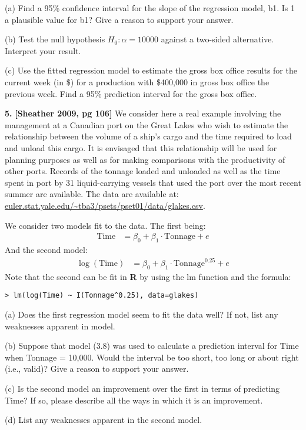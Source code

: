 \documentclass[12pt]{article}
\begin{document}
(a) Find a 95\% confidence interval for the slope of the regression model, b1. Is 1 a plausible value for b1? Give a reason to support your answer.

(b) Test the null hypothesis $H_0: \alpha =10000$ against a two-sided alternative. Interpret your result.

(c) Use the fitted regression model to estimate the gross box office results for the current week (in \$) for a production with \$400,000 in gross box office the previous week. Find a 95\% prediction interval for the gross box office.

{\bf 5.} {\bf [Sheather 2009, pg 106]} We consider here a real example involving
the management at a Canadian port on the Great Lakes who wish to estimate the relationship between
the volume of a ship’s cargo and the time required to load and unload this cargo. It is envisaged
that this relationship will be used for planning purposes as well as for making comparisons with
the productivity of other ports. Records of the tonnage loaded and unloaded as well as the time
spent in port by 31 liquid-carrying vessels that used the port over the most recent summer are
available. The data are available at: \url{euler.stat.yale.edu/~tba3/psets/pset01/data/glakes.csv}.

We consider two models fit to the data. The first being:
\begin{align}
\text{Time} &= \beta_0 + \beta_1 \cdot \text{Tonnage} + e
\end{align}
And the second model:
\begin{align}
\log(\text{Time}) &= \beta_0 + \beta_1 \cdot \text{Tonnage}^{0.25} + e
\end{align}
Note that the second can be fit in {\bf R} by using the lm function and
the formula:
\begin{verbatim}
> lm(log(Time) ~ I(Tonnage^0.25), data=glakes)
\end{verbatim}

(a) Does the first regression model seem to fit the data well?
If not, list any weaknesses apparent in model.

(b) Suppose that model (3.8) was used to calculate a prediction
interval for Time when Tonnage = 10,000. Would the interval be
too short, too long or about right (i.e., valid)? Give a reason
to support your answer.

(c) Is the second model an improvement over the first in terms of predicting Time?
If so, please describe all the ways in which it is an improvement.

(d) List any weaknesses apparent in the second model.
\end{document}
